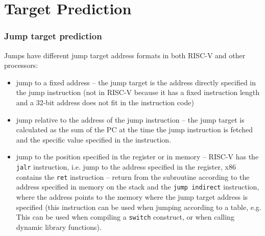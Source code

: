 \documentclass{beamer}
\begin{document}
\section{Target Prediction}

\begin{frame}
\frametitle{Jump target prediction}

Jumps have different jump target address formats in both RISC-V and other processors:
\begin{itemize}
\item jump to a fixed address -- the jump target is the address directly specified in the jump instruction (not in RISC-V because it has a fixed instruction length and a 32-bit address does not fit in the instruction code)
\item jump relative to the address of the jump instruction -- the jump target is calculated as the sum of the PC at the time the jump instruction is fetched and the specific value specified in the instruction.
\item jump to the position specified in the register or in memory -- RISC-V has the \texttt{jalr} instruction, i.e. jump to the address specified in the register, x86 contains the \texttt{ret} instruction -- return from the subroutine according to the address specified in memory on the stack and the \texttt{jump indirect} instruction, where the address points to the memory where the jump target address is specified (this instruction can be used when jumping according to a table, e.g. This can be used when compiling a \texttt{switch} construct, or when calling dynamic library functions).
\end{itemize}
\end{frame}
\end{document}
